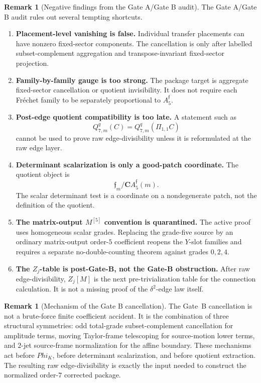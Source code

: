 \documentclass[11pt,a4paper]{amsart}
\def\Phi{Phi}%
\theoremstyle{plain}
\theoremstyle{definition}
\newtheorem{remark}[theorem]{Remark}
\begin{document}
\begin{remark}[Negative findings from the Gate A/Gate B audit]
\label{rem:negative-findings-gate-a-gate-b-audit}
The Gate A/Gate B audit rules out several tempting shortcuts.

\begin{enumerate}
\item \textbf{Placement-level vanishing is false.}
Individual transfer placements can have nonzero fixed-sector components.
The cancellation is only after labelled subset-complement aggregation and
transpose-invariant fixed-sector projection.

\item \textbf{Family-by-family gauge is too strong.}
The package target is aggregate fixed-sector cancellation or quotient
invisibility.  It does not require each Fr\'echet family to be separately
proportional to \(A_5^{\mathfrak f}\).

\item \textbf{Post-edge quotient compatibility is too late.}
A statement such as
\[
Q_{7,m}^q(C)=Q_{7,m}^q(\Pi_{1,1}C)
\]
cannot be used to prove raw edge-divisibility unless it is reformulated at
the raw edge layer.

\item \textbf{Determinant scalarization is only a good-patch coordinate.}
The quotient object is
\[
\mathfrak f_m/\mathbf C A_5^{\mathfrak f}(m).
\]
The scalar determinant test is a coordinate on a nondegenerate patch, not
the definition of the quotient.

\item \textbf{The matrix-output \(M^{[5]}\) convention is quarantined.}
The active proof uses homogeneous scalar grades.  Replacing the grade-five
source by an ordinary matrix-output order-\(5\) coefficient reopens the
\(Y\)-slot families and requires a separate no-double-counting theorem
against grades \(0,2,4\).

\item \textbf{The \(Z_j\)-table is post-Gate-B, not the Gate-B
obstruction.} After raw edge-divisibility, \(Z_j[M]\) is the next
pre-trivialization table for the connection calculation.  It is not a
missing proof of the \(\delta^2\)-edge law itself.
\end{enumerate}
\end{remark}

\begin{remark}[Mechanism of the Gate B cancellation]
\label{rem:mechanism-gate-b-cancellation}
The Gate~B cancellation is not a brute-force finite coefficient accident.
It is the combination of three structural symmetries: odd total-grade
subset-complement cancellation for amplitude terms, moving Taylor-frame
telescoping for source-motion lower terms, and \(2\)-jet source-frame
normalization for the affine boundary.  These mechanisms act before
\(\Phi_K\), before determinant scalarization, and before quotient
extraction.  The resulting raw edge-divisibility is exactly the input
needed to construct the normalized order-\(7\) corrected package.
\end{remark}
\end{document}
